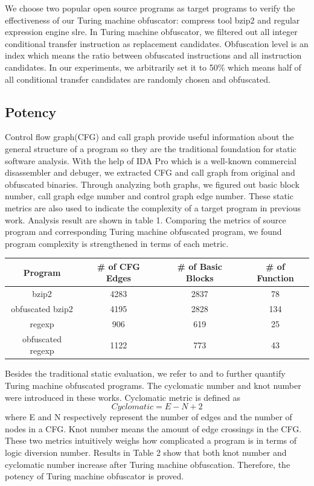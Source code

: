\documentclass[lnicst]{svmultln}
\begin{document}
We choose two popular open source programs as target programs to verify the effectiveness of our Turing machine obfuscator: compress tool bzip2\cite{bzip2} and regular expression engine slre\cite{slre}. In Turing machine obfuscator, we filtered out all integer conditional transfer instruction as replacement candidates. Obfuscation level is an index which means the ratio between obfuscated instructions and all instruction candidates. In our experiments, we arbitrarily set it to 50\% which means half of all conditional transfer candidates are randomly chosen and obfuscated.
\subsection{Potency}
%
Control flow graph(CFG) and call  graph provide useful information about the general structure of a program so they are the traditional foundation for static software analysis. With the help of IDA Pro\cite{ida} which is a well-known commercial disassembler and debuger, we extracted CFG and call graph from original and obfuscated binaries. Through analyzing both graphs, we figured out basic block number, call graph edge number and control graph edge number. These static metrics are also used to indicate the complexity of a target program in previous work\cite{Chen}. Analysis result are shown in table 1. Comparing the metrics of source program and corresponding Turing machine obfuscated program, we found program complexity is strengthened in terms of each metric.


\begin{center}
 
 \begin{tabular}{|c | c | c | c|}
 \hline 
 Program & \# of CFG Edges & \# of Basic Blocks & \# of Function \\
 \hline
bzip2 & 4283 & 2837 & 78 \\ 
 \hline
obfuscated bzip2 & 4195 & 2828 & 134 \\
 \hline
regexp & 906 & 619 & 25 \\ 
 \hline
obfuscated regexp & 1122 & 773 & 43 \\
 \hline
\end{tabular}
\end{center}

Besides the traditional static evaluation, we refer to \cite{McCabe} and \cite{Woodward} to further quantify Turing machine obfuscated programs. The cyclomatic number and knot number were introduced in these works. Cyclomatic metric is defined as \[ Cyclomatic = E - N + 2 \] where E and N respectively represent the number of edges and the number of nodes in a CFG. Knot number means the amount of edge crossings in the CFG. These two metrics intuitively weighs how complicated a program is in terms of logic diversion number. Results in Table 2 show that both knot number and cyclomatic number increase after Turing machine obfuscation. Therefore, the potency of Turing machine obfuscator is proved.
\end{document}
